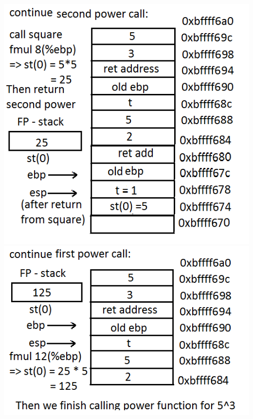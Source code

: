 \documentclass{article}
\begin{document}
\includegraphics[scale=0.5]{stack16.png}\\
\includegraphics[scale=0.5]{stack17.png}
\end{document}
